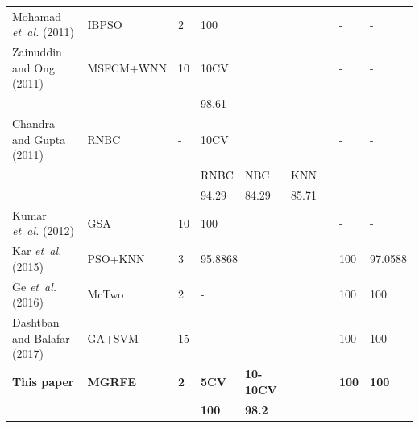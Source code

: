 \documentclass[10pt,journal,compsoc]{IEEEtran}
\begin{document}
\begin{table}[htbp]
{\begin{tabular}{llllllllllll}
				Mohamad \emph{et~al.} (2011) \cite{P16} & IBPSO & \multicolumn{4}{l}{2} & \multicolumn{4}{l}{100} & {-} & {-} \\
				Zainuddin and Ong (2011) \cite{P23}
				& MSFCM+WNN & \multicolumn{4}{l}{10} & \multicolumn{4}{l}{10CV} & {-} & {-} \\
				\cline{7-7}
				\multicolumn{6}{l}{} & \multicolumn{4}{l}{98.61} & & \\

				Chandra and Gupta (2011) \cite{P9} & RNBC & \multicolumn{4}{l}{-} & 10CV & & & & {-} & {-} \\
				\cline{7-9}
				\multicolumn{6}{l}{} & RNBC & NBC & KNN \\
				\cline{7-9}
				\multicolumn{6}{l}{} & 94.29 & 84.29 & 85.71 & & & \\
				Kumar \emph{et~al.} (2012) \cite{P11} & GSA & \multicolumn{4}{l}{10} & \multicolumn{4}{l}{100} & {-} & {-}\\
				Kar \emph{et~al.} (2015) \cite{W15} & PSO+KNN & \multicolumn{4}{l}{3} & \multicolumn{4}{l}{95.8868} & 100 & 97.0588\\
				Ge \emph{et~al.} (2016) \cite{W16} & McTwo & \multicolumn{4}{l}{2} & \multicolumn{4}{l}{-} & 100 & 100\\
				Dashtban and Balafar (2017) \cite{P33} & GA+SVM & \multicolumn{4}{l}{15} & \multicolumn{4}{l}{-} & 100 & 100\\
				
				\textbf{This paper} & \textbf{MGRFE} & \multicolumn{4}{l}{\textbf{2}} & \textbf{5CV} & \textbf{10-10CV} & \multicolumn{2}{l}{} & \textbf{100} & \textbf{100}\\
				\cline{7-8}
				\multicolumn{6}{l}{} & \textbf{100} & \textbf{98.2}\\
				
				\bottomrule
		\end{tabular}}
	\end{table}
	
\end{document}
